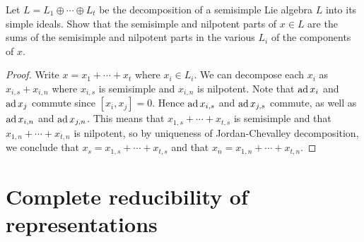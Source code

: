 \begin{ex}
  Let $L = L_1 \oplus \cdots \oplus L_t$ be the decomposition of a semisimple Lie algebra $L$ into its simple ideals. Show that the semisimple and nilpotent parts of $x \in L$ are the sums of the semisimple and nilpotent parts in the various $L_i$ of the components of $x$.
\end{ex}
\begin{proof}
  Write $x = x_1+\cdots+x_t$ where $x_i \in L_i$. We can decompose each $x_i$ as $x_{i,s}+x_{i,n}$ where $x_{i,s}$ is semisimple and $x_{i,n}$ is nilpotent. Note that $\operatorname{ad} x_i$ and $\operatorname{ad} x_j$ commute since $[x_i, x_j] = 0$.
  Hence $\operatorname{ad} x_{i,s}$ and $\operatorname{ad} x_{j,s}$ commute, as well as $\operatorname{ad} x_{i,n}$ and $\operatorname{ad} x_{j,n}$. This means that $x_{1,s}+\cdots+x_{t,s}$ is semisimple and that $x_{1,n} + \cdots + x_{t,n}$ is nilpotent, so by uniqueness of Jordan-Chevalley decomposition, we conclude that $x_s = x_{1,s} + \cdots + x_{t,s}$ and that $x_n = x_{1,n} + \cdots + x_{t,n}$.
\end{proof}

\section{Complete reducibility of representations}




